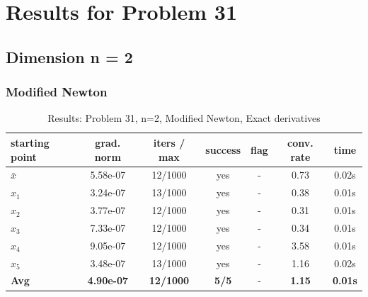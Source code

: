 
\section{Results for Problem 31}

\subsection{Dimension n = 2}

\subsubsection{Modified Newton}

\begin{longtable}{|l|c|c|c|c|c|c|}
\caption{Results: Problem 31, n=2, Modified Newton, Exact derivatives} \\
\hline
\textbf{starting point} & \textbf{grad. norm} & \textbf{iters / max} & \textbf{success} & \textbf{flag} & \textbf{conv. rate} & \textbf{time} \\
\hline
\endfirsthead
\endhead
\endfoot
\hline
\endlastfoot
$\bar{x}$ & 5.58e-07 & 12/1000 & yes & - & 0.73 & 0.02s \\
\hline
$x_1$ & 3.24e-07 & 13/1000 & yes & - & 0.38 & 0.01s \\
\hline
$x_2$ & 3.77e-07 & 12/1000 & yes & - & 0.31 & 0.01s \\
\hline
$x_3$ & 7.33e-07 & 12/1000 & yes & - & 0.34 & 0.01s \\
\hline
$x_4$ & 9.05e-07 & 12/1000 & yes & - & 3.58 & 0.01s \\
\hline
$x_5$ & 3.48e-07 & 13/1000 & yes & - & 1.16 & 0.02s \\
\hline
\hline\hline
\textbf{Avg} & \textbf{4.90e-07} & \textbf{12/1000} & \textbf{5/5} & - & \textbf{1.15} & \textbf{0.01s} \\
\hline\hline
\end{longtable}


